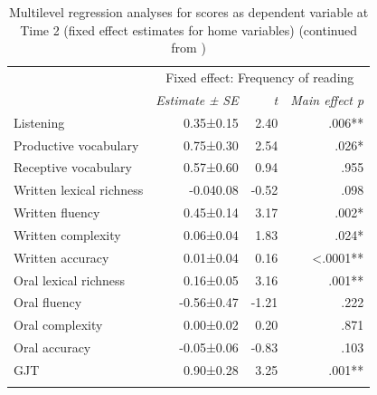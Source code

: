 \documentclass[output=paper,modfonts,nonflat,newtxmath]{langsci/langscibook}
\begin{document}
\begin{table}
	\caption{\label{tab:pfenninger:18} Multilevel regression analyses for scores as dependent variable at Time 2 (fixed effect estimates for home variables) (continued from )}
	\begin{tabularx}{0.85\textwidth}{l rrr}
		\lsptoprule
		& \multicolumn{3}{c}{ Fixed effect: Frequency of reading}\\
		\cmidrule{2-4}
		& \textit{Estimate} \textit{±} \textit{SE} & \textit{t}  & \textit{Main effect p}\\
		\cmidrule{1-4}
		Listening & 0.35±0.15 & 2.40 & .006** \\
		Productive vocabulary & 0.75±0.30 & 2.54 & .026* \\
		Receptive vocabulary & 0.57±0.60 & 0.94 & .955  \\
		Written lexical richness & -0.040.08 & -0.52 & .098 \\
		Written fluency & 0.45±0.14 & 3.17 & .002* \\
		Written complexity & 0.06±0.04 & 1.83 & .024* \\
		Written accuracy & 0.01±0.04 & 0.16 & <.0001** \\
		Oral lexical richness & 0.16±0.05 & 3.16 & .001**\\
		Oral fluency & -0.56±0.47 & -1.21 & .222  \\
		Oral complexity & 0.00±0.02 & 0.20 & .871 \\
		Oral accuracy & {}-0.05±0.06 & -0.83 & .103\\
		GJT & 0.90±0.28 & 3.25 & .001** \\
			\lspbottomrule
	\end{tabularx}
\end{table}
\end{document}

